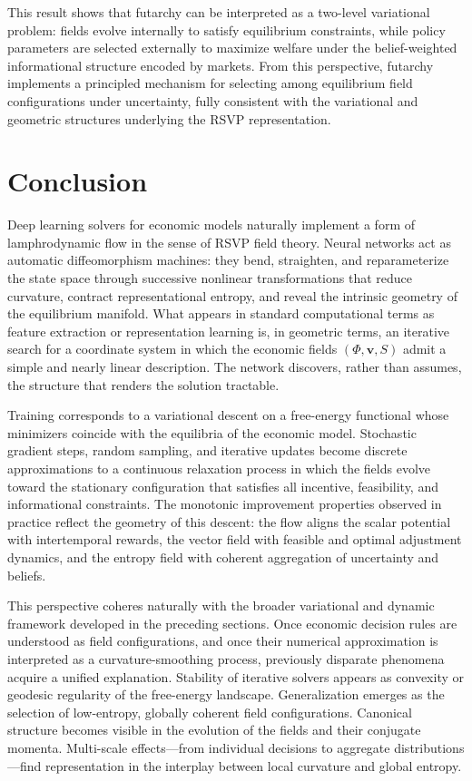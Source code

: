 \documentclass[12pt]{article}
\begin{document}
This result shows that futarchy can be interpreted as a two-level variational
problem: fields evolve internally to satisfy equilibrium constraints, while
policy parameters are selected externally to maximize welfare under the
belief-weighted informational structure encoded by markets.  From this
perspective, futarchy implements a principled mechanism for selecting among
equilibrium field configurations under uncertainty, fully consistent with the
variational and geometric structures underlying the RSVP representation.


\section*{Conclusion}

Deep learning solvers for economic models naturally implement a form of
lamphrodynamic flow in the sense of RSVP field theory.  Neural networks act as
automatic diffeomorphism machines: they bend, straighten, and reparameterize the
state space through successive nonlinear transformations that reduce curvature,
contract representational entropy, and reveal the intrinsic geometry of the
equilibrium manifold.  What appears in standard computational terms as feature
extraction or representation learning is, in geometric terms, an iterative
search for a coordinate system in which the economic fields
\((\Phi,\mathbf{v},S)\) admit a simple and nearly linear description.  The
network discovers, rather than assumes, the structure that renders the solution
tractable.

Training corresponds to a variational descent on a free-energy functional whose
minimizers coincide with the equilibria of the economic model.  Stochastic
gradient steps, random sampling, and iterative updates become discrete
approximations to a continuous relaxation process in which the fields evolve
toward the stationary configuration that satisfies all incentive, feasibility,
and informational constraints.  The monotonic improvement properties observed in
practice reflect the geometry of this descent: the flow aligns the scalar
potential with intertemporal rewards, the vector field with feasible and optimal
adjustment dynamics, and the entropy field with coherent aggregation of
uncertainty and beliefs.

This perspective coheres naturally with the broader variational and dynamic
framework developed in the preceding sections.  Once economic decision rules are
understood as field configurations, and once their numerical approximation is
interpreted as a curvature-smoothing process, previously disparate phenomena
acquire a unified explanation.  Stability of iterative solvers appears as
convexity or geodesic regularity of the free-energy landscape.  Generalization
emerges as the selection of low-entropy, globally coherent field
configurations.  Canonical structure becomes visible in the evolution of the
fields and their conjugate momenta.  Multi-scale effects—from individual
decisions to aggregate distributions—find representation in the interplay
between local curvature and global entropy.
\end{document}
